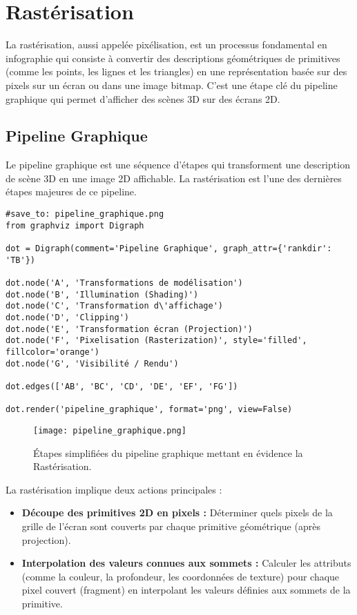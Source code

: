 \documentclass{article}
\begin{document}
\sloppy

\section{Rastérisation}

La rastérisation, aussi appelée pixélisation, est un processus fondamental en infographie qui consiste à convertir des descriptions géométriques de primitives (comme les points, les lignes et les triangles) en une représentation basée sur des pixels sur un écran ou dans une image bitmap. C'est une étape clé du pipeline graphique qui permet d'afficher des scènes 3D sur des écrans 2D.

\subsection{Pipeline Graphique}
Le pipeline graphique est une séquence d'étapes qui transforment une description de scène 3D en une image 2D affichable. La rastérisation est l'une des dernières étapes majeures de ce pipeline.

\begin{verbatim}
#save_to: pipeline_graphique.png
from graphviz import Digraph

dot = Digraph(comment='Pipeline Graphique', graph_attr={'rankdir': 'TB'})

dot.node('A', 'Transformations de modélisation')
dot.node('B', 'Illumination (Shading)')
dot.node('C', 'Transformation d\'affichage')
dot.node('D', 'Clipping')
dot.node('E', 'Transformation écran (Projection)')
dot.node('F', 'Pixelisation (Rasterization)', style='filled', fillcolor='orange')
dot.node('G', 'Visibilité / Rendu')

dot.edges(['AB', 'BC', 'CD', 'DE', 'EF', 'FG'])

dot.render('pipeline_graphique', format='png', view=False)
\end{verbatim}

\begin{figure}[H]
\centering
\texttt{[image: pipeline\_graphique.png]}
\caption{Étapes simplifiées du pipeline graphique mettant en évidence la Rastérisation.}
\label{fig:pipeline_graphique}
\end{figure}

La rastérisation implique deux actions principales :
\begin{itemize}
    \item \textbf{Découpe des primitives 2D en pixels :} Déterminer quels pixels de la grille de l'écran sont couverts par chaque primitive géométrique (après projection).
    \item \textbf{Interpolation des valeurs connues aux sommets :} Calculer les attributs (comme la couleur, la profondeur, les coordonnées de texture) pour chaque pixel couvert (fragment) en interpolant les valeurs définies aux sommets de la primitive.
\end{itemize}
\end{document}
